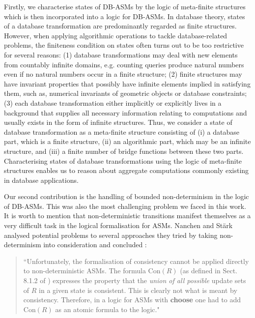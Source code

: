 \documentclass[preprint,11pt]{elsarticle}
\theoremstyle{definition}
\theoremstyle{remark}
\begin{document}
\medskip
Firstly, we characterise states of DB-ASMs by the
logic of meta-finite structures \cite{graedel:infcomp1998} which is
then incorporated into a logic for DB-ASMs. In database theory,
states of a database transformation are predominantly regarded as finite structures. However, when applying algorithmic
operations to tackle database-related problems, the finiteness condition on
states often turns out to be too restrictive for several reasons: (1)
database transformations may deal with new elements from countably
infinite domains, e.g. counting queries produce natural numbers
even if no natural numbers occur in a finite structure; (2) finite structures may have invariant properties that possibly have
infinite elements implied in satisfying them, such as, numerical
invariants of geometric objects or database constraints; (3) each
database transformation either implicitly or explicitly lives in a
background that supplies all necessary information relating to
computations and usually exists in the form of infinite structures.
Thus, we consider a state of database transformation as a
meta-finite structure consisting of (i) a database part, which is a
finite structure, (ii) an algorithmic part, which may be an infinite
structure, and (iii) a finite number of bridge functions between these two parts.
Characterising states of database transformations using the logic
of meta-finite structures enables us to
reason about aggregate computations commonly existing in database
applications.


Our second contribution is the handling of bounded non-determinism
in the logic of DB-ASMs. This was also the most challenging problem
we faced in this work. It is worth to mention that
non-deterministic transitions manifest themselves as a very
difficult task in the logical formalisation for ASMs. Nanchen and St\"ark analysed potential problems to several
approaches they tried by taking non-determinism into consideration
and concluded \cite{RobertLogicASM}:

\begin{quote}
    ``Unfortunately, the formalisation of consistency cannot be applied directly to non-deterministic ASMs. The formula Con$(R)$ (as defined in Sect. 8.1.2 of \cite{boerger:2003}) expresses the property that the \emph{union of all possible} update sets of $R$ in a given state is consistent. This is clearly not what is meant by consistency. Therefore, in a logic for ASMs with \textbf{choose} one had to add Con$(R)$ as an atomic formula to the logic."
\end{quote}
\end{document}
